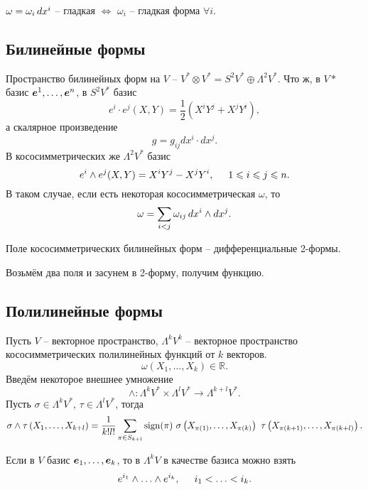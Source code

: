 \begin{to_lem} 
    $\omega = \omega_i \d x^i$  -- гладкая $\Leftrightarrow$ $\omega_i$ -- гладкая форма $\forall i$.
\end{to_lem}


\subsection{Билинейные формы}

Пространство билинейных форм на $V$ -- $V^* \otimes V^* = S^2 V^* \oplus \Lambda^2 V^*$. Что ж, в $V*$ базис $\set{\vc{e}}{n}$, в $S^2 V^*$ базис 
$$
    e^i \cdot e^j (X, Y) = \frac{1}{2} \left(
        X^i Y^j + X^j Y^i
    \right),
$$
а скалярное произведение
$$
    g = g_{ij} dx^i \cdot dx^j.
$$
В кососимметрических же $\Lambda^2 V^*$ базис
\begin{equation}
    e^i \wedge e^j (X, Y) = X^i Y^j - X^j Y^i,
    \hspace{0.5cm} 1 \leq i \leq j \leq n.
\end{equation}
В таком случае, если есть некоторая кососимметрическая $\omega$, то
$$
    \omega = \sum_{i < j} \omega_{ij} \d x^i \wedge dx^j.
$$

\begin{to_def} 
     Поле кососимметрических билинейных форм -- дифференциальные 2-формы.
\end{to_def}

Возьмём два поля и засунем в 2-форму, получим функцию. 

\subsection{Полилинейные формы}

Пусть $V$ -- векторное пространство, $\Lambda^k V^k$ -- векторное пространство кососимметрических полилинейных функций от $k$ векторов. 
$$
    \omega\left(
        X_1, \ldots, X_k
    \right) \in \mathbb{R}.
$$
Введём некоторое внешнее умножение
$$
    \wedge \colon
    \Lambda^k V^* \times \Lambda^l V^* \to \Lambda^{k+l} V^*.
$$
Пусть $\sigma \in \Lambda^k V^*$, $\tau \in \Lambda^l V^*$, тогда
$$
    \sigma \wedge \tau \left(X_1, \ldots, X_{k+l}\right)
    =
    \frac{1}{k! l!} \sum_{\pi \in S_{k+l}} \sign (\pi) 
    \
    \sigma
    \left(
        X_{\pi(1)}, \ldots, X_{\pi(k)} 
    \right)
    \
    \tau
    \left(
        X_{\pi(k+1)},\ldots,X_{\pi(k+l)}
    \right).
$$

Если в $V$ базис $\vc{e}_1, \ldots, \vc{e}_k$, то в $\Lambda^k V$ в качестве базиса можно взять
$$
    e^{i_1} \wedge \ldots \wedge e^{i_k},
    \hspace{0.5cm} 
    i_1 < \ldots < i_k.
$$

